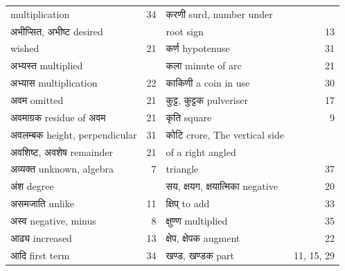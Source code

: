 \documentclass[]{article}
\begin{document}
{{\begin{tabular}{lr|lr}
\quad multiplication &34 & करणी surd, number under\\
अभीप्सित, अभीष्ट desired &&\quad root sign &13\\

\quad wished&21& कर्ण hypotenuse &31\\

अभ्यस्त multiplied&&कला minute of arc &21\\
अभ्यास multiplication &22&काकिणी a coin in use &30\\

अवम omitted &21&कुट्ट, कुट्टक pulveriser & 17\\

अवमाग्रक residue of अवम &21&कृति square &9\\

अवलम्बक height, perpendicular &31&कोटि crore, The vertical side&\\
अवशिष्ट, अवशेष remainder &21&\quad of a right angled&\\
अव्यक्त unknown, algebra & 7 &\quad triangle &37\\

अंश degree & &सय, क्षयग, क्षयात्मिका negative &20\\

असमजाति unlike &11&क्षिप् to add &33\\

अस्व negative, minus & 8 &क्षुण्ण multiplied& 35\\

आढ्य increased &13 &क्षेप, क्षेपक augment& 22\\
	
आदि first term & 34 & खण्ड, खण्डक part & \hspace{-5mm} 11, 15, 29\\
\end{tabular}
}}
\newpage
\normalsize
\end{document}
